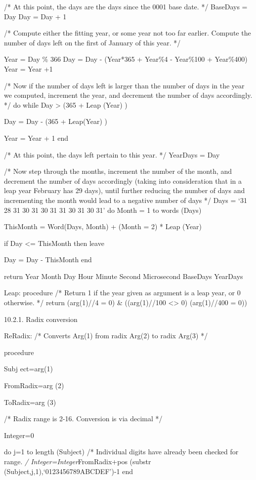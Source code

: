 /* At this point, the days are the days since the 0001 base date. */
BaseDays = Day Day = Day + 1

/* Compute either the fitting year, or some year not too far earlier.
Compute the number of days left on the first of January of this year. */

Year = Day \% 366 Day = Day - (Year*365 + Year\%4 - Year\%100 +
Year\%400) Year = Year +1

/* Now if the number of days left is larger than the number of days in
the year we computed, increment the year, and decrement the number of
days accordingly. */ do while Day \textgreater{} (365 + Leap (Year) )

Day = Day - (365 + Leap(Year) )

Year = Year + 1 end

/* At this point, the days left pertain to this year. */ YearDays = Day

/* Now step through the months, increment the number of the month, and
decrement the number of days accordingly (taking into consideration that
in a leap year February has 29 days), until further reducing the number
of days and incrementing the month would lead to a negative number of
days */ Days = `31 28 31 30 31 30 31 31 30 31 30 31' do Month = 1 to
words (Days)

ThisMonth = Word(Days, Month) + (Month = 2) * Leap (Year)

if Day \textless= ThisMonth then leave

Day = Day - ThisMonth end

return Year Month Day Hour Minute Second Microsecond BaseDays YearDays

Leap: procedure /* Return 1 if the year given as argument is a leap
year, or 0 otherwise. */ return (arg(1)//4 = 0) \& ((arg(1)//100
\textless\textgreater{} 0) \textbar{} (arg(1)//400 = 0))

10.2.1. Radix conversion

ReRadix: /* Converts Arg(1) from radix Arg(2) to radix Arg(3) */

procedure

Subj ect=arg(1)

FromRadix=arg (2)

ToRadix=arg (3)

/* Radix range is 2-16. Conversion is via decimal */

Integer=0

do j=1 to length (Subject) /* Individual digits have already been
checked for range. \emph{/ Integer=Integer}FromRadix+pos (substr
(Subject,j,1),`0123456789ABCDEF')-1 end

